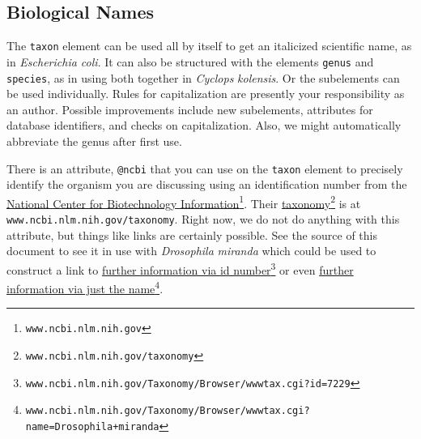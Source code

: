\documentclass{sn-jnl}
\theoremstyle{thmstyleone}%
\theoremstyle{thmstyletwo}%
\theoremstyle{thmstylethree}%
\newcommand{\mono}[1]{\texttt{#1}}
\numberwithin{equation}{section}
\begin{document}
\subsection{Biological Names}\label{section-text-paragraphs-13}%
%
%
%
The \mono{taxon} element can be used all by itself to get an italicized scientific name, as in \textit{Escherichia coli}.  It can also be structured with the elements \mono{genus} and \mono{species}, as in using both together in \textit{Cyclops} \textit{kolensis}.  Or the subelements can be used individually.  Rules for capitalization are presently your responsibility as an author.  Possible improvements include new subelements, attributes for database identifiers, and checks on capitalization.  Also, we might automatically abbreviate the genus after first use.%
\par
There is an attribute, \mono{@ncbi} that you can use on the \mono{taxon} element to precisely identify the organism you are discussing using an identification number from the \href{https://www.ncbi.nlm.nih.gov/}{National Center for Biotechnology Information}\footnote{\nolinkurl{www.ncbi.nlm.nih.gov}\label{section-text-paragraphs-13-6-7}}.  Their \href{https://www.ncbi.nlm.nih.gov/taxonomy}{taxonomy}\footnote{\nolinkurl{www.ncbi.nlm.nih.gov/taxonomy}\label{section-text-paragraphs-13-6-9}} is at \mono{www.ncbi.nlm.nih.gov/taxonomy}.  Right now, we do not do anything with this attribute, but things like links are certainly possible.  See the source of this document to see it in use with \textit{Drosophila} \textit{miranda} which could be used to construct a link to \href{https://www.ncbi.nlm.nih.gov/Taxonomy/Browser/wwwtax.cgi?id=7229}{further information via id number}\footnote{\nolinkurl{www.ncbi.nlm.nih.gov/Taxonomy/Browser/wwwtax.cgi?id=7229}\label{section-text-paragraphs-13-6-13}} or even \href{https://www.ncbi.nlm.nih.gov/Taxonomy/Browser/wwwtax.cgi?name=Drosophila+miranda}{further information via just the name}\footnote{\nolinkurl{www.ncbi.nlm.nih.gov/Taxonomy/Browser/wwwtax.cgi?name=Drosophila+miranda}\label{section-text-paragraphs-13-6-15}}.%
%
%
\typeout{************************************************}
\typeout{Subsection 10 Verbatim in titles, \mono{\textbackslash{}a\&b\#c\%d\textasciitilde{}e\{f\}g\$h\_i\textasciicircum{}j}, OK}
\typeout{************************************************}
%
\end{document}
